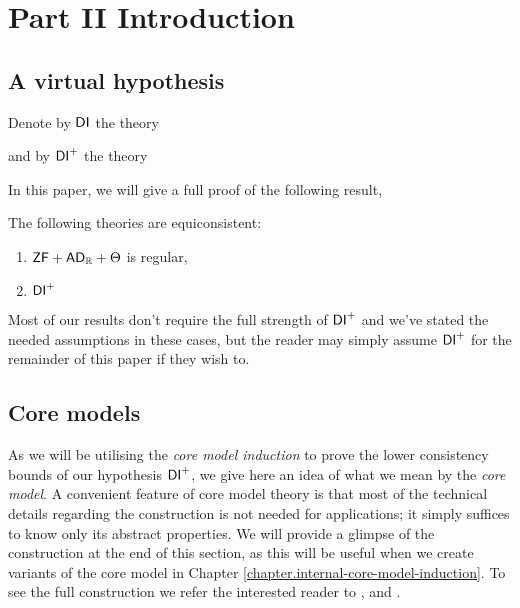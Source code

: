 \documentclass[../../main]{subfiles}
\begin{document}
\chapter{Part II Introduction}
\thispagestyle{fancy}


\section{A virtual hypothesis}


\qquad Denote by $\operatorname{\textsf{DI}}$ the theory

and by $\operatorname{\textsf{DI}}^+$ the theory

In this paper, we will give a full proof of the following result,

\begin{theorem}
  The following theories are equiconsistent:
  \begin{enumerate}
    \item $\textsf{ZF} + \textsf{AD}_{\mathbb{R}} + \Theta$ is regular,
    \item $\operatorname{\textsf{DI}}^+$
  \end{enumerate}
\end{theorem}

Most of our results don't require the full strength of $\operatorname{\textsf{DI}}^+$ and we've stated the needed assumptions in these cases, but the reader may simply assume $\operatorname{\textsf{DI}}^+$ for the remainder of this paper if they wish to.


\section{Core models}

As we will be utilising the \textit{core model induction} to prove the lower consistency bounds of our hypothesis $\operatorname{\textsf{DI}}^+$, we give here an idea of what we mean by the \textit{core model}. A convenient feature of core model theory is that most of the technical details regarding the construction is not needed for applications; it simply suffices to know only its abstract properties. We will provide a glimpse of the construction at the end of this section, as this will be useful when we create variants of the core model in Chapter \ref{chapter.internal-core-model-induction}. To see the full construction we refer the interested reader to \cite{MSc}, \cite{Zeman} and \cite{Kwithoutmeasurable}. 
\end{document}
